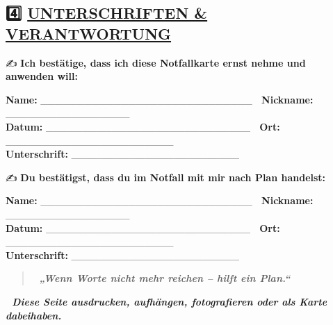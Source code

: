 \hypertarget{unterschriften-verantwortung}{%
\subsection{\texorpdfstring{\textbf{4️⃣ \ul{UNTERSCHRIFTEN \& VERANTWORTUNG}}}{4️⃣ UNTERSCHRIFTEN \& VERANTWORTUNG}}\label{unterschriften-verantwortung}}

✍️ \textbf{Ich bestätige, dass ich diese Notfallkarte ernst nehme und anwenden will:}

\textbf{Name:} \_\_\_\_\_\_\_\_\_\_\_\_\_\_\_\_\_\_\_\_\_\_\_\_\_\_\_\_\_ 📝 \textbf{Nickname:} \_\_\_\_\_\_\_\_\_\_\_\_\_\_\_\_\_\\
\textbf{Datum:} \_\_\_\_\_\_\_\_\_\_\_\_\_\_\_\_\_\_\_\_\_\_\_\_\_\_\_\_ 📝 \textbf{Ort:} \_\_\_\_\_\_\_\_\_\_\_\_\_\_\_\_\_\_\_\_\_\_\_\\
\textbf{Unterschrift:} \_\_\_\_\_\_\_\_\_\_\_\_\_\_\_\_\_\_\_\_\_\_\_

✍️ \textbf{Du bestätigst, dass du im Notfall mit mir nach Plan handelst:}

\textbf{Name:} \_\_\_\_\_\_\_\_\_\_\_\_\_\_\_\_\_\_\_\_\_\_\_\_\_\_\_\_\_ 📝 \textbf{Nickname:} \_\_\_\_\_\_\_\_\_\_\_\_\_\_\_\_\_\\
\textbf{Datum:} \_\_\_\_\_\_\_\_\_\_\_\_\_\_\_\_\_\_\_\_\_\_\_\_\_\_\_\_ 📝 \textbf{Ort:} \_\_\_\_\_\_\_\_\_\_\_\_\_\_\_\_\_\_\_\_\_\_\_\\
\textbf{Unterschrift:} \_\_\_\_\_\_\_\_\_\_\_\_\_\_\_\_\_\_\_\_\_\_\_

\begin{quote}
💬 \emph{\textbf{„Wenn Worte nicht mehr reichen -- hilft ein Plan.``}}
\end{quote}

\textbf{📎 \emph{Diese Seite ausdrucken, aufhängen, fotografieren oder als Karte dabeihaben.}}



